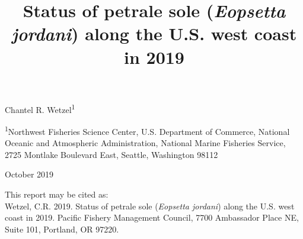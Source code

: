 \documentclass[12pt,]{article}
\title{Status of petrale sole (\emph{Eopsetta jordani}) along the U.S. west
coast in 2019}
\author{}
\date{}
\begin{document}
\maketitle


\begin{center}
\thispagestyle{empty}


\vspace{.5cm}




Chantel R. Wetzel\textsuperscript{1}\\


\vspace{.5cm}

\small
\textsuperscript{1}Northwest Fisheries Science Center, U.S. Department of Commerce, National Oceanic and Atmospheric Administration, National Marine Fisheries Service, 2725 Montlake Boulevard East, Seattle, Washington 98112\\

\vspace{.3cm}





\vspace{1cm}

\vfill
October 2019

\vspace{1cm}



\vspace{.3cm}

\newpage

\vspace{3cm}

This report may be cited as:\\

Wetzel, C.R. 2019. Status of petrale sole (\textit{Eopsetta jordani}) along the U.S. west coast in 2019. Pacific Fishery Management Council, 7700 Ambassador Place NE, Suite 101, Portland, OR 97220. 
\end{center}
\end{document}
